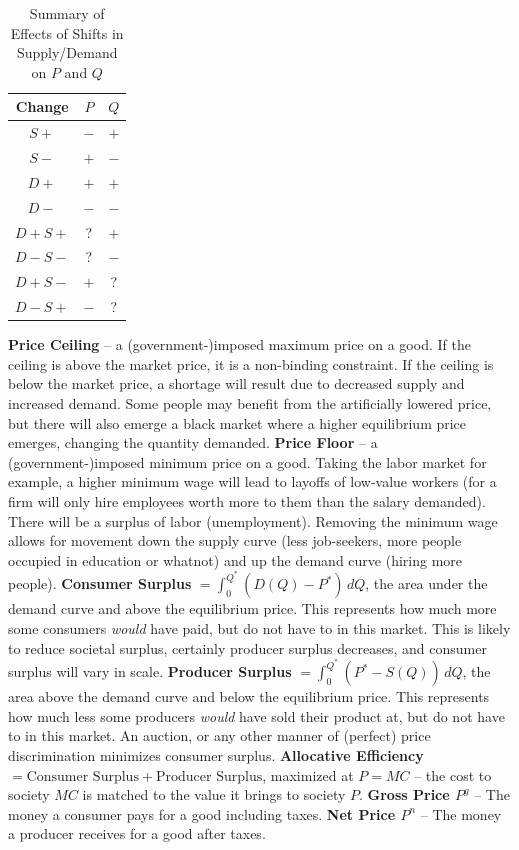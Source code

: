 \documentclass{article}
\def\term #1{\termb{#1} --}
\def\termb #1{\1 \textbf{#1}}
\begin{document}
\begin{table}[hb]
    \centering
    \begin{tabular}{c|c|c}
         Change & $P$ & $Q$ \\
         \hline
         $S +$ & $-$ & $+$ \\
         $S -$ & $+$ &  $-$ \\
         $D +$ & $+$ & $+$ \\
         $D -$ & $-$ &  $-$ \\
         $D + S +$ & ? & $+$ \\
         $D - S -$ & ? & $-$ \\
         $D + S -$ & $+$ & ? \\
         $D - S +$ & $-$ & ? \\
    \end{tabular}
    \caption{Summary of Effects of Shifts in Supply/Demand on $P$ and $Q$}
    \label{tab:2.1}
\end{table}

\begin{outline}
    \term{Price Ceiling}
    a (government-)imposed maximum price on a good.
    \2 If the ceiling is above the market price, it is a non-binding constraint.
    \2 If the ceiling is below the market price, a shortage will result due to decreased supply and increased demand. Some people may benefit from the artificially lowered price, but there will also emerge a black market where a higher equilibrium price emerges, changing the quantity demanded.
    \term{Price Floor}
    a (government-)imposed minimum price on a good.
    \2 Taking the labor market for example, a higher minimum wage will lead to layoffs of low-value workers (for a firm will only hire employees worth more to them than the salary demanded). There will be a surplus of labor (unemployment). Removing the minimum wage allows for movement down the supply curve (less job-seekers, more people occupied in education or whatnot) and up the demand curve (hiring more people).
    \termb{Consumer Surplus}
    $= \int_0^{Q^*} \left(D(Q) - P^*\right) \,dQ$, the area under the demand curve and above the equilibrium price. This represents how much more some consumers \textit{would} have paid, but do not have to in this market.
    \2 This is likely to reduce societal surplus, certainly producer surplus decreases, and consumer surplus will vary in scale.
    \termb{Producer Surplus}
    $= \int_0^{Q^*} \left(P^*-S(Q)\right) \,dQ$, the area above the demand curve and below the equilibrium price. This represents how much less some producers \textit{would} have sold their product at, but do not have to in this market.
    \2 An auction, or any other manner of (perfect) price discrimination minimizes consumer surplus.
    \termb{Allocative Efficiency} $= \textrm{Consumer Surplus} + \textrm{Producer Surplus}$, maximized at $P=MC$ -- the cost to society $MC$ is matched to the value it brings to society $P$.
    \term{Gross Price $P^g$} The money a consumer pays for a good including taxes.
    \term{Net Price $P^n$} The money a producer receives for a good after taxes.
\end{outline}
\end{document}

